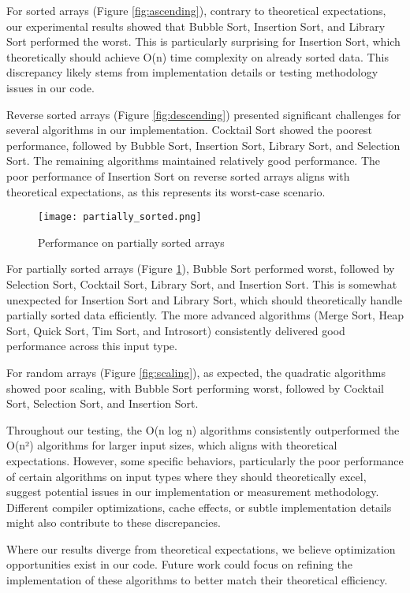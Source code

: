 \documentclass[sigconf]{acmart}
\begin{document}
For sorted arrays (Figure \ref{fig:ascending}), contrary to theoretical expectations, our experimental results showed that Bubble Sort, Insertion Sort, and Library Sort performed the worst. This is particularly surprising for Insertion Sort, which theoretically should achieve O(n) time complexity on already sorted data. This discrepancy likely stems from implementation details or testing methodology issues in our code.

Reverse sorted arrays (Figure \ref{fig:descending}) presented significant challenges for several algorithms in our implementation. Cocktail Sort showed the poorest performance, followed by Bubble Sort, Insertion Sort, Library Sort, and Selection Sort. The remaining algorithms maintained relatively good performance. The poor performance of Insertion Sort on reverse sorted arrays aligns with theoretical expectations, as this represents its worst-case scenario.

\begin{figure}[h]
  \centering
  \texttt{[image: partially\_sorted.png]}
  \caption{Performance on partially sorted arrays}
  \label{fig:partially}
\end{figure}

For partially sorted arrays (Figure \ref{fig:partially}), Bubble Sort performed worst, followed by Selection Sort, Cocktail Sort, Library Sort, and Insertion Sort. This is somewhat unexpected for Insertion Sort and Library Sort, which should theoretically handle partially sorted data efficiently. The more advanced algorithms (Merge Sort, Heap Sort, Quick Sort, Tim Sort, and Introsort) consistently delivered good performance across this input type.

For random arrays (Figure \ref{fig:scaling}), as expected, the quadratic algorithms showed poor scaling, with Bubble Sort performing worst, followed by Cocktail Sort, Selection Sort, and Insertion Sort.

Throughout our testing, the O(n log n) algorithms consistently outperformed the O(n²) algorithms for larger input sizes, which aligns with theoretical expectations. However, some specific behaviors, particularly the poor performance of certain algorithms on input types where they should theoretically excel, suggest potential issues in our implementation or measurement methodology. Different compiler optimizations, cache effects, or subtle implementation details might also contribute to these discrepancies.

Where our results diverge from theoretical expectations, we believe optimization opportunities exist in our code. Future work could focus on refining the implementation of these algorithms to better match their theoretical efficiency.
\end{document}
